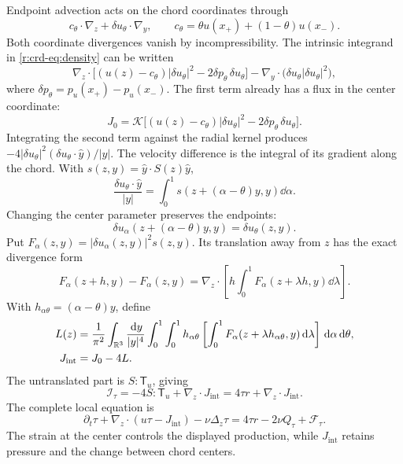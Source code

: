 Endpoint advection acts on the chord coordinates through
\[
 c_\theta\cdot\nabla_z+\delta u_\theta\cdot\nabla_y,\qquad
 c_\theta=\theta u(x_+)+(1-\theta)u(x_-).
\]
Both coordinate divergences vanish by incompressibility. The intrinsic
integrand in \eqref{r:crd-eq:density} can be written
\[
 \nabla_z\cdot\bigl[(u(z)-c_\theta)|\delta u_\theta|^2
               -2\delta p_\theta\,\delta u_\theta\bigr]
 -\nabla_y\cdot\bigl(\delta u_\theta|\delta u_\theta|^2\bigr),
\]
where \(\delta p_\theta=p_u(x_+)-p_u(x_-)\).
The first term already has a flux in the center coordinate:
\begin{equation}
 J_0=\mathcal K\bigl[(u(z)-c_\theta)|\delta u_\theta|^2
               -2\delta p_\theta\,\delta u_\theta\bigr].
 \label{r:crd-eq:first-flux}
\end{equation}
Integrating the second term against the radial kernel produces
\(-4|\delta u_\theta|^2(\delta u_\theta\cdot\widehat y)/|y|\).
The velocity difference is the integral of its gradient along the chord.
With \(s(z,y)=\widehat y\cdot S(z)\widehat y\),
\[
 \frac{\delta u_\theta\cdot\widehat y}{|y|}
 =\int_0^1s(z+(\alpha-\theta)y,y)\dd\alpha.
\]
Changing the center parameter preserves the endpoints:
\[
 \delta u_\alpha(z+(\alpha-\theta)y,y)
 =\delta u_\theta(z,y).
\]
Put \(F_\alpha(z,y)=|\delta u_\alpha(z,y)|^2s(z,y)\).
Its translation away from \(z\) has the exact divergence form
\[
 F_\alpha(z+h,y)-F_\alpha(z,y)
 =\nabla_z\cdot
 \left[h\int_0^1F_\alpha(z+\lambda h,y)\dd\lambda\right].
\]
With \(h_{\alpha\theta}=(\alpha-\theta)y\), define
\begin{equation}
 \begin{aligned}
 L(z)={}&\frac1{\pi^2}\int_{\mathbb R^3}\frac{\,\mathrm d y}{|y|^4}
 \int_0^1\int_0^1 h_{\alpha\theta}
 \left[\int_0^1F_\alpha(z+\lambda h_{\alpha\theta},y)
                         \,\mathrm d\lambda\right]\,\mathrm d\alpha\,\mathrm d\theta,\\
 J_{\mathrm{int}}={}&J_0-4L.
 \end{aligned}
 \label{r:crd-eq:full-flux}
\end{equation}
The untranslated part is \(S:\mathsf T_u\), giving
\begin{equation}
 \mathcal I_\tau=-4S:\mathsf T_u+\nabla_z\cdot J_{\mathrm{int}}
 =4\tau r+\nabla_z\cdot J_{\mathrm{int}}.
 \label{r:crd-eq:intrinsic-split}
\end{equation}
The complete local equation is
\begin{equation}
 \partial_t\tau+\nabla_z\cdot(u\tau-J_{\mathrm{int}})
 -\nu\Delta_z\tau
 =4\tau r-2\nu Q_\tau+\mathcal F_\tau.
 \label{r:crd-eq:local-conservation}
\end{equation}
The strain at the center controls the displayed production, while
\(J_{\mathrm{int}}\) retains pressure and the change between chord centers.


